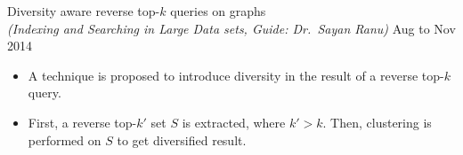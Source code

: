 \documentclass[10pt]{article}
\newenvironment{innerlist}[1][\enskip\textbullet]%
        {\begin{itemize}[#1,leftmargin=*,parsep=0pt,itemsep=0pt,topsep=0pt,partopsep=0pt]}
        {\end{itemize}}
\newcommand{\halfblankline}{\quad\vspace{-0.5\baselineskip}\pagebreak[3]}
\begin{document}
%
%
Diversity aware reverse top-$k$ queries on graphs \\
\emph{(Indexing and Searching in Large Data sets, Guide: Dr.\ Sayan Ranu)} \hfill{Aug to Nov 2014}
\vspace{0.1in}
\begin{innerlist}
	\item A technique is proposed to introduce diversity in the result of a reverse top-$k$ query.
	\item First, a reverse top-$k'$ set $S$ is extracted, where $k'>k$. Then, clustering is performed on $S$ to get diversified result.
\end{innerlist}
%
\end{document}
